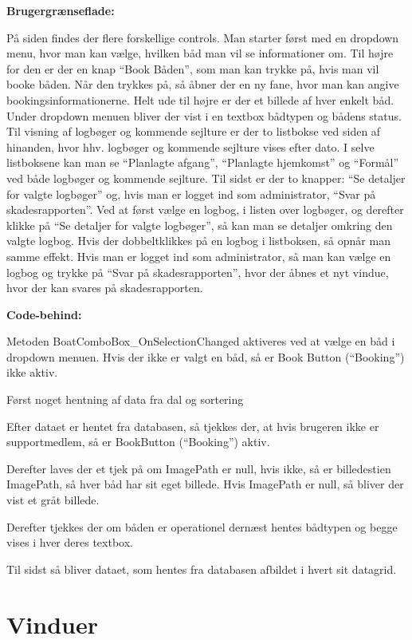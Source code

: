 \textbf{Brugergrænseflade:}

På siden findes der flere forskellige controls.
Man starter først med en dropdown menu, hvor man kan vælge, hvilken båd man vil se informationer om.
Til højre for den er der en knap ``Book Båden'', som man kan trykke på, hvis man vil booke båden. Når den trykkes på, så åbner der en ny fane, hvor man kan angive bookingsinformationerne. 
Helt ude til højre er der et billede af hver enkelt båd. 
Under dropdown menuen bliver der vist i en textbox bådtypen og bådens status. 
Til visning af logbøger og kommende sejlture er der to listbokse ved siden af hinanden, hvor hhv. logbøger og kommende sejlture vises efter dato. 
I selve listboksene kan man se ``Planlagte afgang'', ``Planlagte hjemkomst'' og ``Formål'' ved både logbøger og kommende sejlture. 
Til sidst er der to knapper: ``Se detaljer for valgte logbøger'' og, hvis man er logget ind som administrator, ``Svar på skadesrapporten''. Ved at først vælge en logbog, i listen over logbøger, og derefter klikke på ``Se detaljer for valgte logbøger'', så kan man se detaljer omkring den valgte logbog. 
Hvis der dobbeltklikkes på en logbog i listboksen, så opnår man samme effekt. 
Hvis man er logget ind som administrator, så man kan vælge en logbog og trykke på ``Svar på skadesrapporten'', hvor der åbnes et nyt vindue, hvor der kan svares på skadesrapporten. 

\textbf{Code-behind:}

Metoden BoatComboBox\_OnSelectionChanged aktiveres ved at vælge en båd i dropdown menuen. 
Hvis der ikke er valgt en båd, så er Book Button (``Booking'') ikke aktiv. 

Først noget hentning af data fra dal og sortering

Efter dataet er hentet fra databasen, så tjekkes der, at hvis brugeren ikke er supportmedlem, så er BookButton (``Booking'') aktiv. 

Derefter laves der et tjek på om ImagePath er null, hvis ikke, så er billedestien ImagePath, så hver båd har sit eget billede. 
Hvis ImagePath er null, så bliver der vist et gråt billede.

Derefter tjekkes der om båden er operationel dernæst hentes bådtypen og begge vises i hver deres textbox. 

Til sidst så bliver dataet, som hentes fra databasen afbildet i hvert sit datagrid.


\section{Vinduer}


